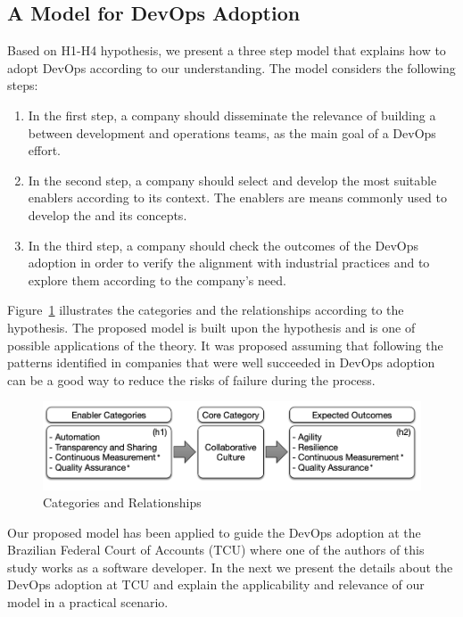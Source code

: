 \subsection{A Model for DevOps Adoption}\label{sec:case_study}

Based on H1-H4 hypothesis, we present a three step model that
explains how to adopt DevOps according to our understanding. The
model considers the following steps:

\begin{enumerate}
\item In the first step, a company should
  disseminate the relevance of building a \cc between
  development and operations teams, as the main
  goal of a DevOps effort.

\item In the second step, a company should select and develop
the most suitable enablers according to its context. The enablers
are means commonly used to develop the \cc and its concepts.

\item In the third step, a company should check the outcomes of the
DevOps adoption in order to verify the alignment with
industrial practices and to explore them according to the company's need.
\end{enumerate}

Figure~\ref{model} illustrates the categories and the
relationships according to the hypothesis. The proposed model is built upon
the hypothesis and is one of possible applications of the theory. It was proposed
assuming that following the patterns identified in companies that were
well succeeded in DevOps adoption can be a good way to reduce the risks of
failure during the process.

\begin{figure}[bht]
  \centering
  \includegraphics[width=.75\textwidth]{model.png}
  \caption{Categories and Relationships}
  \label{model}
\end{figure}


Our proposed model has been applied to guide the DevOps adoption at the
Brazilian Federal Court of Accounts (TCU) where one of the authors of this study
works as a software developer. In the next we present the details about the DevOps
adoption at TCU and explain the applicability and relevance of our model in a
practical scenario. 
